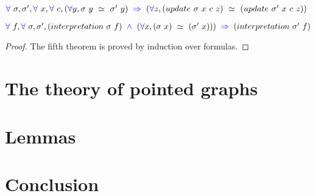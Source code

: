 \documentclass[a4paper]{article}
\begin{document}
\begin{theorem}
$\fa \ \sigma, \sigma', \fa \ x, \fa \ c, (\fa y, \sigma \ y \ \simeq \ \sigma' \ y) \ \imp \ (\fa z, (update \ \sigma \ x \ c \ z) \ \simeq \ (update \ \sigma' \ x \ c \ z))$
\end{theorem}

\begin{theorem}
$\fa \ f, \fa \ \sigma, \sigma', (interpretation \ \sigma \ f) \ \conj \ (\fa x, (\sigma \ x) \ \simeq \ (\sigma' \ x))) \ \imp \ (interpretation \ \sigma' \ f)$
\end{theorem}

\begin{proof}
The fifth theorem is proved by induction over formulas.
\end{proof}


\section{The theory of pointed graphs}


\section{Lemmas}


\section{Conclusion}
\end{document}
